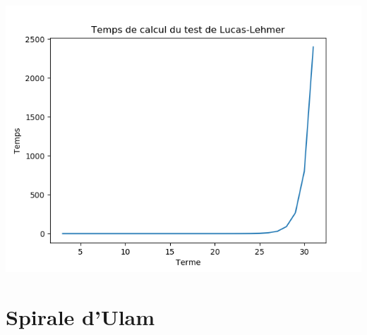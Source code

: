 \documentclass{beamer}
\begin{document}
\begin{frame}
\begin{center}
\includegraphics[scale=0.5]{images/evo_lucas.png}
\end{center}
\end{frame}

\section{Spirale d'Ulam}
\end{document}
